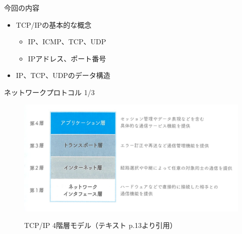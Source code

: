 \documentclass[12pt,aspectratio=169]{beamer}
\begin{document}
\begin{frame}{今回の内容}

  \begin{itemize}
    \item TCP/IPの基本的な概念
      \begin{itemize}
        \item IP、ICMP、TCP、UDP
        \item IPアドレス、ポート番号
      \end{itemize}
    \item IP、TCP、UDPのデータ構造
  \end{itemize}

\end{frame}


\begin{frame}{ネットワークプロトコル 1/3}

  \centering
  \begin{figure}
    \centering
    \includegraphics[width=12cm,bb=0 0 1352 676]{./figures/text_figure1_11.png}
    \label{fig:text_figure1_11}
    \caption{TCP/IP 4階層モデル（テキスト p.13より引用）}
  \end{figure}

\end{frame}
\end{document}
